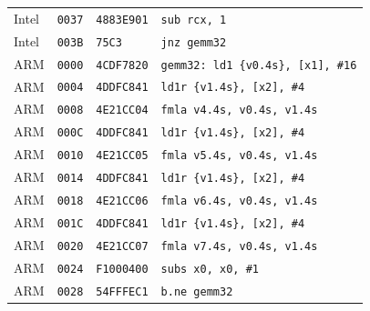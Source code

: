 \begin{table}[htbp]
\begin{tabular}{@{}l|l|l|p{7.2cm}@{}}
Intel & \texttt{0037} & \texttt{4883E901} & \texttt{sub rcx, 1} \\
Intel & \texttt{003B} & \texttt{75C3} & \texttt{jnz gemm32} \\
\midrule
ARM & \texttt{0000} & \texttt{4CDF7820} & \texttt{gemm32: ld1 \{v0.4s\}, [x1], \#16} \\
ARM & \texttt{0004} & \texttt{4DDFC841} & \texttt{ld1r \{v1.4s\}, [x2], \#4} \\
ARM & \texttt{0008} & \texttt{4E21CC04} & \texttt{fmla v4.4s, v0.4s, v1.4s} \\
ARM & \texttt{000C} & \texttt{4DDFC841} & \texttt{ld1r \{v1.4s\}, [x2], \#4} \\
ARM & \texttt{0010} & \texttt{4E21CC05} & \texttt{fmla v5.4s, v0.4s, v1.4s} \\
ARM & \texttt{0014} & \texttt{4DDFC841} & \texttt{ld1r \{v1.4s\}, [x2], \#4} \\
ARM & \texttt{0018} & \texttt{4E21CC06} & \texttt{fmla v6.4s, v0.4s, v1.4s} \\
ARM & \texttt{001C} & \texttt{4DDFC841} & \texttt{ld1r \{v1.4s\}, [x2], \#4} \\
ARM & \texttt{0020} & \texttt{4E21CC07} & \texttt{fmla v7.4s, v0.4s, v1.4s} \\
ARM & \texttt{0024} & \texttt{F1000400} & \texttt{subs x0, x0, \#1} \\
ARM & \texttt{0028} & \texttt{54FFFEC1} & \texttt{b.ne gemm32} \\
\bottomrule
\end{tabular}
\endgroup
\end{table}
\noindent{}\par
